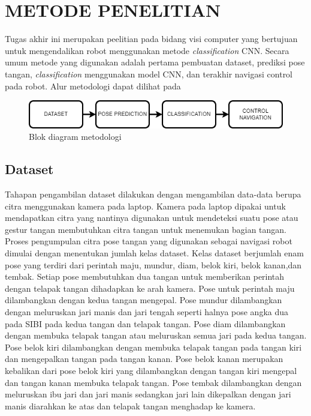 \chapter{METODE PENELITIAN}
\label{chap:desainimplementasi}


Tugas akhir ini merupakan peelitian pada bidang visi computer yang bertujuan untuk mengendalikan robot menggunakan metode \emph{classification} CNN. Secara umum metode yang digunakan adalah pertama pembuatan dataset, prediksi pose tangan, \emph{classification} menggunakan model CNN, dan terakhir navigasi control pada robot. Alur metodologi dapat dilihat pada

\begin{figure}[!h]
  \centering
	\includegraphics[width=1\linewidth]{gambar/metodologi.png}
	\caption{Blok diagram metodologi}
	\label{fig:metodologi}
\end{figure}

\section{Dataset}
\label{sec:deskripsisistem}

Tahapan pengambilan dataset dilakukan dengan mengambilan data-data berupa citra menggunakan kamera pada laptop. Kamera pada laptop dipakai untuk mendapatkan citra yang nantinya digunakan untuk mendeteksi suatu pose atau gestur tangan membutuhkan citra tangan untuk menemukan bagian tangan. Proses pengumpulan citra pose tangan yang digunakan sebagai navigasi robot  dimulai dengan menentukan jumlah kelas dataset. Kelas dataset berjumlah enam pose yang terdiri dari perintah maju, mundur, diam, belok kiri, belok kanan,dan tembak. Setiap pose membutuhkan dua tangan untuk memberikan perintah dengan telapak tangan dihadapkan ke arah kamera. Pose untuk perintah maju dilambangkan dengan kedua tangan mengepal. Pose mundur dilambangkan dengan meluruskan jari manis dan jari tengah seperti halnya pose angka dua pada SIBI pada kedua tangan dan telapak tangan.  Pose diam dilambangkan dengan membuka telapak tangan atau meluruskan semua jari pada kedua tangan.  Pose belok kiri dilambangkan dengan membuka telapak tangan pada tangan kiri dan mengepalkan tangan pada tangan kanan. Pose belok kanan merupakan kebalikan dari pose belok kiri yang dilambangkan dengan tangan kiri mengepal dan tangan kanan membuka telapak tangan. Pose tembak dilambangkan dengan meluruskan ibu jari dan jari manis sedangkan jari lain dikepalkan dengan jari manis diarahkan ke atas dan telapak tangan menghadap ke kamera.

